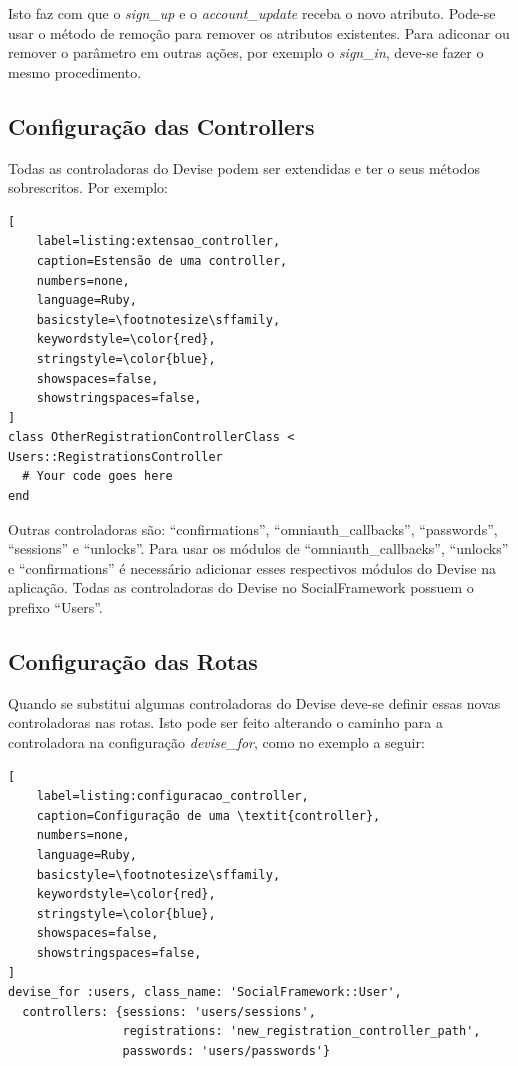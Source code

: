 Isto faz com que o \textit{sign\_up} e o \textit{account\_update} receba o novo atributo. Pode-se usar o método de remoção para remover os atributos existentes. Para adiconar ou remover o parâmetro em outras ações, por exemplo o \textit{sign\_in}, deve-se fazer o mesmo procedimento.

\subsection{Configuração das Controllers}

Todas as controladoras do Devise podem ser extendidas e ter o seus métodos sobrescritos. Por exemplo:

\begin{lstlisting}[
    label=listing:extensao_controller,
    caption=Estensão de uma controller,
    numbers=none,
    language=Ruby,
    basicstyle=\footnotesize\sffamily,
    keywordstyle=\color{red},
    stringstyle=\color{blue},
    showspaces=false,
    showstringspaces=false,
]
class OtherRegistrationControllerClass < Users::RegistrationsController
  # Your code goes here
end
\end{lstlisting}

Outras controladoras são: ``confirmations'', ``omniauth\_callbacks'', ``passwords'', ``sessions'' e ``unlocks''. Para usar os módulos de ``omniauth\_callbacks'', ``unlocks'' e ``confirmations'' é necessário adicionar esses respectivos módulos do Devise na aplicação. Todas as controladoras do Devise no SocialFramework possuem o prefixo ``Users''.

\subsection{Configuração das Rotas}

Quando se substitui algumas controladoras do Devise deve-se definir essas novas controladoras nas rotas. Isto pode ser feito alterando o caminho para a controladora na configuração \textit{devise\_for}, como no exemplo a seguir:

\begin{lstlisting}[
    label=listing:configuracao_controller,
    caption=Configuração de uma \textit{controller},
    numbers=none,
    language=Ruby,
    basicstyle=\footnotesize\sffamily,
    keywordstyle=\color{red},
    stringstyle=\color{blue},
    showspaces=false,
    showstringspaces=false,
]
devise_for :users, class_name: 'SocialFramework::User',
  controllers: {sessions: 'users/sessions',
                registrations: 'new_registration_controller_path',
                passwords: 'users/passwords'}
\end{lstlisting}


